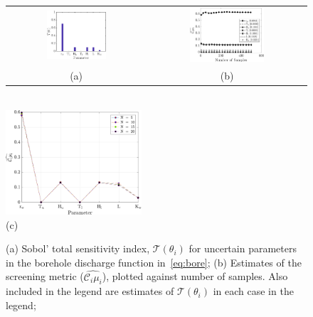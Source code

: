 \begin{figure}[htbp]
 \begin{center}
 \begin{tabular}{cc}
  \includegraphics[width=0.45\textwidth]{./Figures/sense_borehole}
  &
  \includegraphics[width=0.49\textwidth]{./Figures/ub_conv_borehole}
  \\ (a) & (b)
  \end{tabular}
  \\
  \includegraphics[width=0.45\textwidth]{./Figures/ub_conv_borehole2}
  \\ (c)
\caption{
(a) Sobol' total sensitivity index, $\mathcal{T}(\theta_i)$ for uncertain
parameters in the
borehole discharge function in~\eqref{eq:bore}; (b)
Estimates of the screening metric ($\widehat{\mathcal{C}_i\mu_i}$), plotted
against number of samples. Also included in the legend are estimates of
$\mathcal{T}(\theta_i)$ in each case in the legend; }
\label{fig:sense_bore}
\end{center}
\end{figure}

